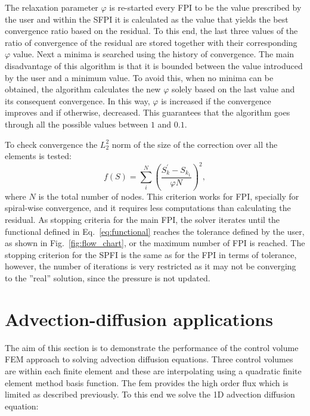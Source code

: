 The relaxation parameter $\varphi$ is re-started every FPI to be the value prescribed by the user and within the SFPI it is calculated as the value that yields the best convergence ratio based on the residual. To this end, the last three values of the ratio of convergence of the residual are stored together with their corresponding $\varphi$ value. Next a minima is searched using the history of convergence. The main disadvantage of this algorithm is that it is bounded between the value introduced by the user and a minimum value. To avoid this, when no minima can be obtained, the algorithm calculates the new $\varphi$ solely based on the last value and its consequent convergence. In this way, $\varphi$ is increased if the convergence improves and if otherwise, decreased. This guarantees that the algorithm goes through all the possible values between $1$ and $0.1$. 

To check convergence the $L_2^2$ norm of the size of the correction over all the elements is tested: 
\begin{equation}
f(S) = \sum_i^N \left( \frac{{S^\prime_k} - S_{k_1}}{\varphi N} \right)^2,
\label{eq:functional}
\end{equation}
where $N$ is the total number of nodes. This criterion works for FPI, specially for spiral-wise convergence, and it requires less computations than calculating the residual.
As stopping criteria for the main FPI, the solver iterates until the functional defined in Eq.~\ref{eq:functional} reaches the tolerance defined by the user, as shown in Fig.~\ref{fig:flow_chart}, or the maximum number of FPI is reached.
The stopping criterion for the SPFI is the same as for the FPI in terms of tolerance, however, the number of iterations is very restricted as it may not be converging to the ''real'' solution, since the pressure is not updated.

\pagebreak


\section{Advection-diffusion applications}
\label{Advection-diffusion applications} 

The aim of this section is to demonstrate the performance of the 
control volume FEM approach to solving advection diffusion equations. 
Three control volumes are within each finite element 
and these are interpolating using a quadratic finite element 
method basis function. The fem provides the high order 
flux which is limited as described previously.  
To this end we solve the 1D advection diffusion equation:


